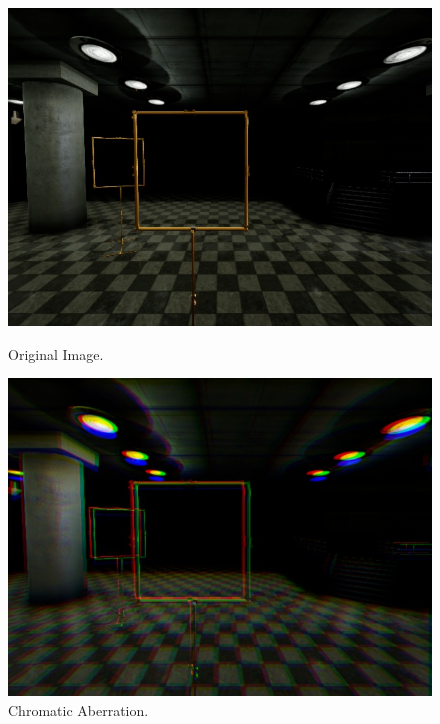\begin{figure}[htbp]
	\centering
	\begin{minipage}{0.33\textwidth}
		\includegraphics[width=\textwidth]{fig/gate_example}
\caption{Original Image.}
\label{fig:orig}
	\end{minipage}
	\begin{minipage}{0.33\textwidth}
\includegraphics[width=\textwidth]{fig/gate_example_chromatic}
	\caption{Chromatic Aberration.} 		
	\label{fig:chromatic}
\end{minipage}
	\begin{minipage}{0.33\textwidth}

\end{minipage}
\end{figure}
